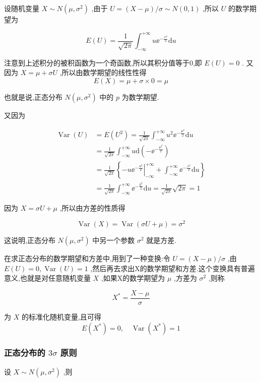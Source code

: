 设随机变量 $ X \sim N\left(\mu, \sigma^{2}\right) $ ,由于 $ U=(X-\mu) / \sigma \sim N(0,1) $ ,所以 $ U $ 的数学期望为

\[
E(U)=\frac{1}{\sqrt{2 \pi}} \int_{-\infty}^{+\infty} u \ee ^{-\frac{x^{2}}{2}} \mathrm{d} u
\]

注意到上述积分的被积函数为一个奇函数,所以其积分值等于0,即 $ E(U)=0 $ .
又因为 $ X=\mu+\sigma U $ ,所以由数学期望的线性性得
\[
E(X)=\mu+\sigma \times 0=\mu
\]

也就是说,正态分布 $ N\left(\mu, \sigma^{2}\right) $ 中的 $ p $ 为数学期望.

又因为

\[
\begin{array}{ll}
{\operatorname{Var}(U)} & {=E\left(U^{2}\right)=\frac{1}{\sqrt{2 \pi}} \int_{-\infty}^{+\infty} u^{2} \ee ^{-\frac{\mu^{2}}{2}} \mathrm{d} u} \\ 
{} & {=\frac{1}{\sqrt{2 \pi}} \int_{-\infty}^{+\infty} u \mathrm{d}\left(-\ee ^{-\frac{\mu^{2}}{2}}\right)} \\ 
{} & {=\frac{1}{\sqrt{2 \pi}}\left\{-u\left.\ee ^{-\frac{u^{2}}{2}}\right|_{-\infty} ^{+\infty}+\int_{-\infty}^{+\infty} \ee ^{-\frac{x^{2}}{2}} \mathrm{d} u\right\}} \\ 
{} & {=\frac{1}{\sqrt{2 \pi}} \int_{-\infty}^{+\infty} \ee ^{-\frac{y^{2}}{2}} \mathrm{d} u=\frac{1}{\sqrt{2 \pi}} \sqrt{2 \pi}=1}
\end{array}
\]

因为 $ X=\sigma U+\mu $ ,所以由方差的性质得

\[
\operatorname{Var}(X)=\operatorname{Var}(\sigma U+\mu)=\sigma^{2}
\]

这说明,正态分布 $ N\left(\mu, \sigma^{2}\right) $ 中另一个参数 $ \sigma^{2} $ 就是方差.

在求正态分布的数学期望和方差中,用到了一种变换:令 $ U=(X-\mu) / \sigma $ ,由 $ E(U)=0, \operatorname{Var}(U)=1 $ ,然后再去求出X的数学期望和方差.这个变换具有普遍意义,也就是对任意随机变量 $ X $ ,如果X的数学期望为 $ \mu $ ,方差为 $ \sigma^{2} $ ,则称

\[
X^{*}=\frac{X-\mu}{\sigma}
\]

为 $ X $ 的标准化随机变量,且可得
\[
E\left(X^{*}\right)=0, \quad \operatorname{Var}\left(X^{*}\right)=1
\]

\subsubsection{正态分布的 $ 3\sigma $ 原则}
设 $ X \sim N\left(\mu, \sigma^{2}\right) $ ,则

